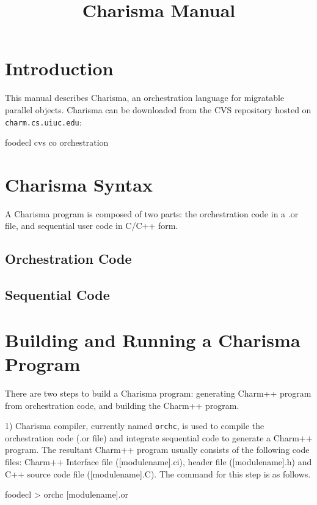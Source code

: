\documentclass[10pt]{article}
\title{Charisma Manual}
\def\smallfbox#1{{\small {\fbox{#1}}}}
\def\code#1{{\small {\tt {#1}}}}
\begin{document}
\maketitle

\section{Introduction}

This manual describes Charisma, an orchestration language for migratable
parallel objects. 
Charisma can be downloaded from the CVS repository hosted on
\texttt{charm.cs.uiuc.edu}:

\begin{SaveVerbatim}{foodecl}
  cvs co orchestration
\end{SaveVerbatim}
\smallfbox{\BUseVerbatim{foodecl}}


\section{Charisma Syntax}
A Charisma program is composed of two parts: the orchestration code in a .or
file, and sequential user code in C/C++ form. 

\subsection{Orchestration Code}


\subsection{Sequential Code}
\label{sec:sequential}


\section{Building and Running a Charisma Program}
There are two steps to build a Charisma program: generating Charm++ program 
from orchestration code, and building the Charm++ program. 

1) Charisma compiler, currently named \code{orchc}, is used to compile the
orchestration code (.or file) and integrate sequential code to generate a
Charm++ program. The resultant Charm++ program usually consists of the 
following code files: Charm++ Interface file ([modulename].ci), header file 
([modulename].h) and C++ source code file ([modulename].C). The command 
for this step is as follows.

\begin{SaveVerbatim}{foodecl}
    > orchc [modulename].or
\end{SaveVerbatim}
\smallfbox{\BUseVerbatim{foodecl}}
\end{document}
